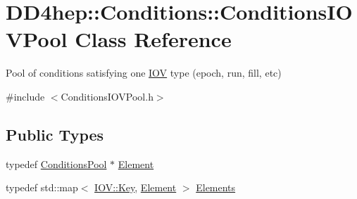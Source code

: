\hypertarget{class_d_d4hep_1_1_conditions_1_1_conditions_i_o_v_pool}{}\section{D\+D4hep\+:\+:Conditions\+:\+:Conditions\+I\+O\+V\+Pool Class Reference}
\label{class_d_d4hep_1_1_conditions_1_1_conditions_i_o_v_pool}


Pool of conditions satisfying one \hyperlink{class_d_d4hep_1_1_i_o_v}{I\+OV} type (epoch, run, fill, etc)  




{\ttfamily \#include $<$Conditions\+I\+O\+V\+Pool.\+h$>$}

\subsection*{Public Types}
\begin{DoxyCompactItemize}
\item 
typedef \hyperlink{class_d_d4hep_1_1_conditions_1_1_conditions_pool}{Conditions\+Pool} $\ast$ \hyperlink{class_d_d4hep_1_1_conditions_1_1_conditions_i_o_v_pool_a41146867e220b8f23ef69afe5f724914}{Element}
\item 
typedef std\+::map$<$ \hyperlink{class_d_d4hep_1_1_i_o_v_a07cb46dc875296dc9cccf4ff370104ae}{I\+O\+V\+::\+Key}, \hyperlink{class_d_d4hep_1_1_conditions_1_1_conditions_i_o_v_pool_a41146867e220b8f23ef69afe5f724914}{Element} $>$ \hyperlink{class_d_d4hep_1_1_conditions_1_1_conditions_i_o_v_pool_aa011c5cc19bfb761be62adf9a88b5ee9}{Elements}
\end{DoxyCompactItemize}
